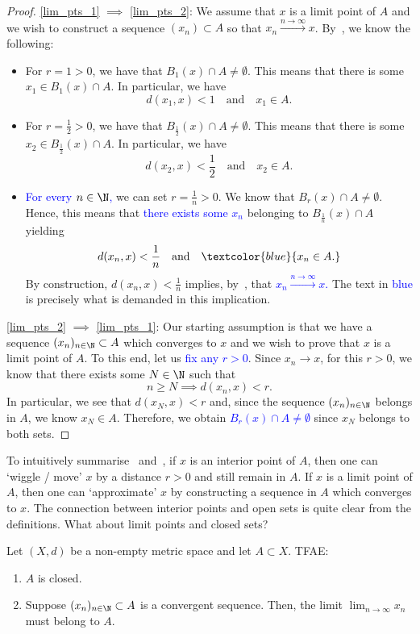 \begin{proof}
	\ref{lim_pts_1} $\implies$ \ref{lim_pts_2}: We assume that $x$ is a limit point of $A$ and we wish to construct a sequence $(x_n)\subset A$ so that $x_n \overset{n\to \infty}{\to} x$. By~, we know the following:
	\begin{itemize}
		\item For $r=1>0$, we have that $B_1(x)\cap A\neq \emptyset$. This means that there is some $x_1 \in B_1(x)\cap A$. In particular, we have
		\[
		d(x_1,x) <1\quad\text{and}\quad x_1 \in A.
		\]
		\item For $r = \frac{1}{2}>0$, we have that $B_\frac{1}{2}(x)\cap A \neq \emptyset$. This means that there is some $x_2 \in B_\frac{1}{2}(x)\cap A$. In particular, we have
		\[
		d(x_2,x) < \frac{1}{2}\quad\text{and}\quad x_2\in A.
		\]
		\item \textcolor{blue}{For every $n\in\N$,} we can set $r = \frac{1}{n}>0$. We know that $B_r(x)\cap A \neq \emptyset$. Hence, this means that \textcolor{blue}{there exists some $x_n$} belonging to $B_\frac{1}{n}(x)\cap A$ yielding
		\[
		d(x_n,x)<\frac{1}{n}\quad\text{and}\quad\textcolor{blue}{x_n \in A.}
		\]
		By construction, $d(x_n,x)<\frac{1}{n}$ implies, by~, that \textcolor{blue}{$x_n \overset{n\to \infty}{\to} x$.} The text in \textcolor{blue}{blue} is precisely what is demanded in this implication.
	\end{itemize}
	\ref{lim_pts_2} $\implies$ \ref{lim_pts_1}: Our starting assumption is that we have a sequence $(x_n)_{n\in\N}\subset A$ which converges to $x$ and we wish to prove that $x$ is a limit point of $A$. To this end, let us \textcolor{blue}{fix any $r>0$}. Since $x_n\to x$, for this $r>0$, we know that there exists some $N\in\N$ such that
	\[
	n\ge N \implies d(x_n,x)<r.
	\]
	In particular, we see that $d(x_N,x)<r$ and, since the sequence $(x_n)_{n\in\N}$ belongs in $A$, we know $x_N \in A$. Therefore, we obtain \textcolor{blue}{$B_r(x)\cap A \neq \emptyset$} since $x_N$ belongs to both sets.
\end{proof}
To intuitively summarise~ and~, if $x$ is an interior point of $A$, then one can `wiggle / move' $x$ by a distance $r>0$ and still remain in $A$. If $x$ is a limit point of $A$, then one can `approximate' $x$ by constructing a sequence in $A$ which converges to $x$. The connection between interior points and open sets is quite clear from the definitions. What about limit points and closed sets?
\begin{lemma}
\label{lem:closed_lim}
Let $(X,d)$ be a non-empty metric space and let $A\subset X$. TFAE:
\begin{enumerate}
	\item \label{closed_lim_1} $A$ is closed.
	\item \label{closed_lim_2} Suppose $(x_n)_{n\in\N}\subset A$ is a convergent sequence. Then, the limit $\lim_{n\to \infty}x_n$ must belong to $A$.
\end{enumerate}
\end{lemma}
